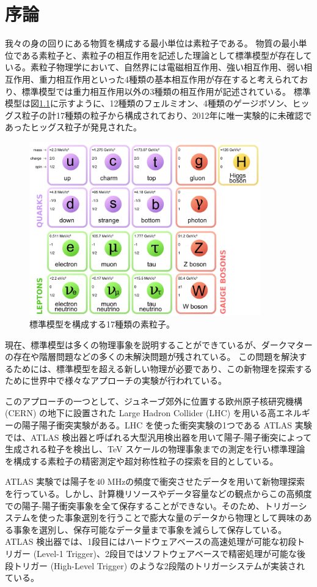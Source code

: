 \chapter{序論}
我々の身の回りにある物質を構成する最小単位は素粒子である。
物質の最小単位である素粒子と、素粒子の相互作用を記述した理論として標準模型が存在している。素粒子物理学において、自然界には電磁相互作用、強い相互作用、弱い相互作用、重力相互作用といった4種類の基本相互作用が存在すると考えられており、標準模型では重力相互作用以外の3種類の相互作用が記述されている。
標準模型は図\ref{fig:標準模型}に示すように、12種類のフェルミオン、4種類のゲージボソン、ヒッグス粒子の計17種類の粒子から構成されており、2012年に唯一実験的に未確認であったヒッグス粒子が発見された\cite{article:Higgs_boson}。
\begin{figure}[tb]
  \centering
  \includegraphics[clip, width=10cm]{fig/1/standardmodel.jpg}
  \caption{標準模型を構成する17種類の素粒子\cite{article:elementary_particles}。}
  \label{fig:標準模型}
\end{figure}

現在、標準模型は多くの物理事象を説明することができているが、ダークマターの存在や階層問題などの多くの未解決問題が残されている。
この問題を解決するためには、標準模型を超える新しい物理が必要であり、この新物理を探索するために世界中で様々なアプローチの実験が行われている。

このアプローチの一つとして、ジュネーブ郊外に位置する欧州原子核研究機構 (CERN) の地下に設置された Large Hadron Collider (LHC) を用いる高エネルギーの陽子陽子衝突実験がある。LHC を使った衝突実験の1つである ATLAS 実験では、ATLAS 検出器と呼ばれる大型汎用検出器を用いて陽子-陽子衝突によって生成される粒子を検出し、TeV スケールの物理事象までの測定を行い標準理論を構成する素粒子の精密測定や超対称性粒子の探索を目的としている。

ATLAS 実験では陽子を$40$ MHzの頻度で衝突させたデータを用いて新物理探索を行っている。しかし、計算機リソースやデータ容量などの観点からこの高頻度での陽子-陽子衝突事象を全て保存することができない。そのため、トリガーシステムを使った事象選別を行うことで膨大な量のデータから物理として興味のある事象を選別し、保存可能なデータ量まで事象を減らして保存している。
ATLAS 検出器では、1段目にはハードウェアベースの高速処理が可能な初段トリガー (Level-1 Trigger)、2段目ではソフトウェアベースで精密処理が可能な後段トリガー (High-Level Trigger) のような2段階のトリガーシステムが実装されている。

